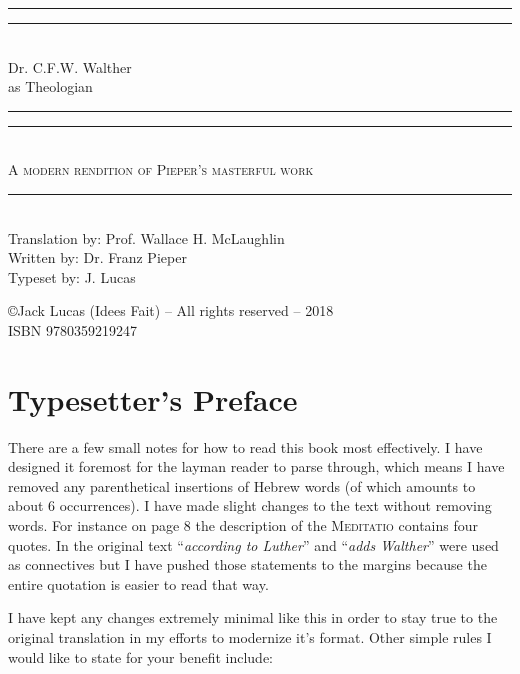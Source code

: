 \documentclass[
     12pt,                     %
     a4paper,                  %
     BCOR=5mm,                %
     DIV=12,                   %
     openright,
     twoside,
     headsepline
]{book}
\begin{document}

\begin{titlepage}

    \begin{center}
    \vspace*{\baselineskip}
    \rule{\textwidth}{1.6pt}\vspace*{-\baselineskip}\vspace*{2pt}
    \rule{\textwidth}{0.4pt}\\[\baselineskip]
    {\LARGE Dr. C.F.W. Walther \\[0.3\baselineskip] as Theologian}\\[0.2\baselineskip]
    \rule{\textwidth}{0.4pt}\vspace*{-\baselineskip}\vspace{3.2pt}
    \rule{\textwidth}{1.6pt}\\[\baselineskip]
    \scshape
    A modern rendition of Pieper's masterful work \\
    \rule{\textwidth}{0.4pt}\vspace*{-\baselineskip}\vspace{3.2pt}
    \\[\baselineskip]
    Translation by: Prof. Wallace H. McLaughlin \\
    Written by: Dr. Franz Pieper \\
    Typeset by: J. Lucas \\
    [\baselineskip]
    
    \vfill

    {\footnotesize \copyright  Jack Lucas (Idees Fait) --  All rights reserved -- 2018\\ISBN 9780359219247}
    \end{center}
  \end{titlepage}
  \frontmatter
\tableofcontents

  \chapter*{Typesetter's Preface}

There are a few small notes for how to read this book most effectively.  I have designed it foremost for the layman reader to parse through,  which means I have removed any parenthetical insertions of Hebrew words {\footnotesize  (of which amounts to about 6 occurrences)}.  I have made slight changes to the text without removing words.  For instance on page 8 the description of the \textsc{Meditatio} contains four quotes.  In the original text ``\textit{according to Luther}'' and ``\textit{adds Walther}'' were used as connectives but I have pushed those statements to the margins because the entire quotation is easier to read that way.  \par  I have kept any changes extremely minimal like this in order to stay true to the original translation in my efforts to modernize it's format.  Other simple rules I would like to state for your benefit include:
\end{document}
